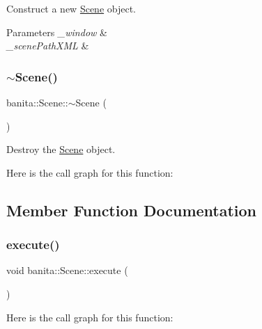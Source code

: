 Construct a new \mbox{\hyperlink{classbanita_1_1_scene}{Scene}} object. 


\begin{DoxyParams}{Parameters}
{\em \+\_\+window} & \\
\hline
{\em \+\_\+scene\+Path\+X\+ML} & \\
\hline
\end{DoxyParams}
\mbox{\label{classbanita_1_1_scene_a1c17873d5172df34c9a6a62dc3b13fa6}} 
\subsubsection{\texorpdfstring{$\sim$Scene()}{~Scene()}}
{\footnotesize\ttfamily banita\+::\+Scene\+::$\sim$\+Scene (\begin{DoxyParamCaption}{ }\end{DoxyParamCaption})\hspace{0.3cm}{\ttfamily [inline]}}



Destroy the \mbox{\hyperlink{classbanita_1_1_scene}{Scene}} object. 

Here is the call graph for this function\+:


\subsection{Member Function Documentation}
\mbox{\label{classbanita_1_1_scene_aaf3588951958ee81114f0e58e5aead92}} 
\subsubsection{\texorpdfstring{execute()}{execute()}}
{\footnotesize\ttfamily void banita\+::\+Scene\+::execute (\begin{DoxyParamCaption}{ }\end{DoxyParamCaption})\hspace{0.3cm}{\ttfamily [inline]}}

Here is the call graph for this function\+:
\mbox{\label{classbanita_1_1_scene_abbb415ef292d34cc6882af2d59e5a25d}} 
